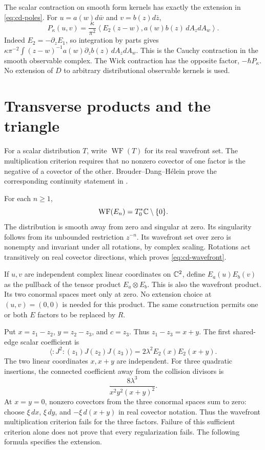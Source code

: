 The scalar contraction on smooth form kernels has exactly the extension
in \eqref{eq:cd-poles}.  For $u=a(w)d\bar w$ and $v=b(z)d\bar z$,
\[
 P_\kappa(u,v)=\frac{\kappa}{\pi^2}
 \left\langle E_2(z-w),a(w)b(z)\,dA_zdA_w\right\rangle.
\]
Indeed $E_2=-\partial_zE_1$, so integration by parts gives
$\kappa\pi^{-2}\int (z-w)^{-1}a(w)\partial_zb(z)\,dA_zdA_w$.
This is the Cauchy contraction in the smooth observable complex.
The Wick contraction has the opposite factor, $-\hbar P_\kappa$.
No extension of $D$ to arbitrary distributional observable kernels is used.

\section{Transverse products and the triangle}

For a scalar distribution $T$, write $\operatorname{WF}(T)$ for its real
wavefront set.  The multiplication criterion requires that no nonzero
covector of one factor is the negative of a covector of the other.
Brouder--Dang--H\'elein prove the corresponding continuity statement in
\cite[Theorem 6.1, p.~21]{BDH2014}.

For each $n\ge1$,
\begin{equation}
 \label{eq:cd-wavefront}
 \operatorname{WF}(E_n)=T_0^*\mathbb C\setminus\{0\}.
\end{equation}
The distribution is smooth away from zero and singular at zero.
Its singularity follows from its unbounded restriction $z^{-n}$.
Its wavefront set over zero is nonempty and invariant under all rotations,
by complex scaling.  Rotations act transitively on real covector directions,
which proves \eqref{eq:cd-wavefront}.

If $u,v$ are independent complex linear coordinates on $\mathbb C^2$, define
$E_a(u)E_b(v)$ as the pullback of the tensor product $E_a\otimes E_b$.
This is also the wavefront product.  Its two conormal spaces meet only at
zero.  No extension choice at $(u,v)=(0,0)$ is needed for this product.
The same construction permits one or both $E$ factors to be replaced by $R$.

Put $x=z_1-z_2$, $y=z_2-z_3$, and $c=z_3$.
Thus $z_1-z_3=x+y$.
The first shared-edge scalar coefficient is
\[
 \langle :J^2:(z_1)J(z_2)J(z_3)\rangle
       =2\lambda^2 E_2(x)E_2(x+y).
\]
The two linear coordinates $x,x+y$ are independent.
For three quadratic insertions, the connected coefficient away from the
collision divisors is
\[
 \frac{8\lambda^3}{x^2y^2(x+y)^2}.
\]
At $x=y=0$, nonzero covectors from the three conormal spaces sum to zero:
choose $\xi\,dx$, $\xi\,dy$, and $-\xi\,d(x+y)$ in real covector notation.
Thus the wavefront multiplication criterion fails for the three factors.
Failure of this sufficient criterion alone does not prove that every
regularization fails.  The following formula specifies the extension.

